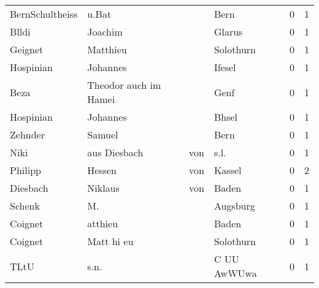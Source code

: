 \begin{center}
\begin{tiny}
\begin{longtabu}{llllrr}
          BernSchultheiss &                              u.Bat &             &                                        Bern &          0 &         1 \\
                    Blldi &                            Joachim &             &                                      Glarus &          0 &         1 \\
                  Geignet &                           Matthieu &             &                                   Solothurn &          0 &         1 \\
                Hospinian &                           Johannes &             &                                      Ifesel &          0 &         1 \\
                     Beza &              Theodor auch im Hamei &             &                                        Genf &          0 &         1 \\
                Hospinian &                           Johannes &             &                                       Bhsel &          0 &         1 \\
                  Zehnder &                             Samuel &             &                                        Bern &          0 &         1 \\
                     Niki &                      aus  Diesbach &         von &                                        s.l. &          0 &         1 \\
                  Philipp &                             Hessen &         von &                                      Kassel &          0 &         2 \\
                 Diesbach &                            Niklaus &         von &                                       Baden &          0 &         1 \\
                   Schenk &                                 M. &             &                                    Augsburg &          0 &         1 \\
                  Coignet &                            atthieu &             &                                       Baden &          0 &         1 \\
                  Coignet &                         Matt hi eu &             &                                   Solothurn &          0 &         1 \\
                     TLtU &                               s.n. &             &                                 C UU AwWUwa &          0 &         1 \\

\end{longtabu}
\end{tiny}
\end{center}
